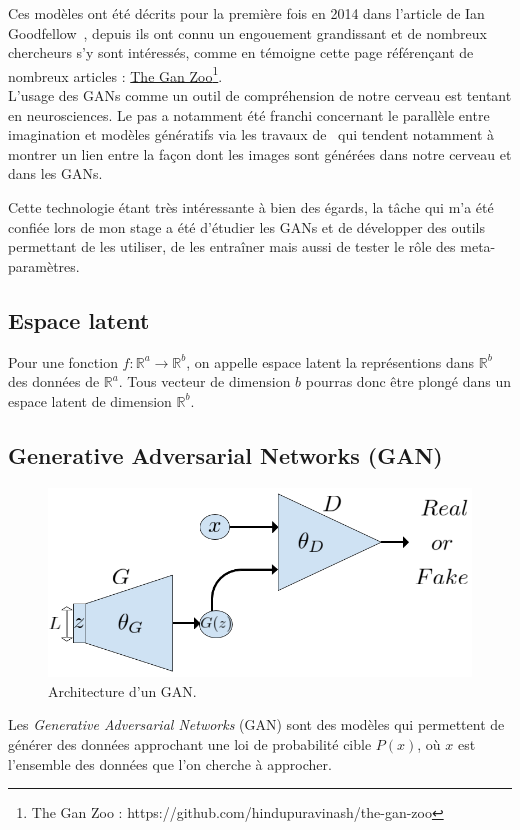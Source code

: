 \documentclass[11pt,francais]{article}
\begin{document}
Ces modèles ont été décrits pour la première fois en 2014 dans l'article de Ian Goodfellow~\cite{NIPS2014_5423}, depuis ils ont connu un engouement grandissant et de nombreux chercheurs s'y sont intéressés, comme en témoigne cette page référençant de nombreux articles : \href{https://github.com/hindupuravinash/the-gan-zoo}{The Gan Zoo}\footnote{\label{note1}The Gan Zoo : https://github.com/hindupuravinash/the-gan-zoo}.\\ 

L'usage des GANs comme un outil de compréhension de notre cerveau est tentant en neurosciences. Le pas a notamment été franchi concernant le parallèle entre imagination et modèles génératifs via les travaux de~\cite{GAN_Brain_Signals} qui tendent notamment à montrer un lien entre la façon dont les images sont générées dans notre cerveau et dans les GANs.

Cette technologie étant très intéressante à bien des égards, la tâche qui m'a été confiée lors de mon stage a été d'étudier les GANs et de développer des outils permettant de les utiliser, de les entraîner mais aussi de tester le rôle des meta-paramètres.

\subsection{Espace latent}
Pour une fonction \(f : \mathbb{R}^a \rightarrow \mathbb{R}^b \), on appelle espace latent la représentions dans \(\mathbb{R}^b\) des données de \(\mathbb{R}^a\).
Tous vecteur de dimension \(b\) pourras donc être plongé dans un espace latent de dimension \(\mathbb{R}^b\).

\subsection{Generative Adversarial Networks (GAN)}
\label{sec:GAN}
\begin{figure}[!h]
    \centering
    \includegraphics[width=\textwidth]{Figures/GAN/GAN_representation.png}
    \caption{Architecture d'un GAN.}
    \label{fig:fig9}
\end{figure}
Les \textit{Generative Adversarial Networks} (GAN) sont des modèles qui permettent de générer des données approchant une loi de probabilité cible \(P(x)\), où \(x\) est l'ensemble des données que l'on cherche à approcher.
\end{document}
